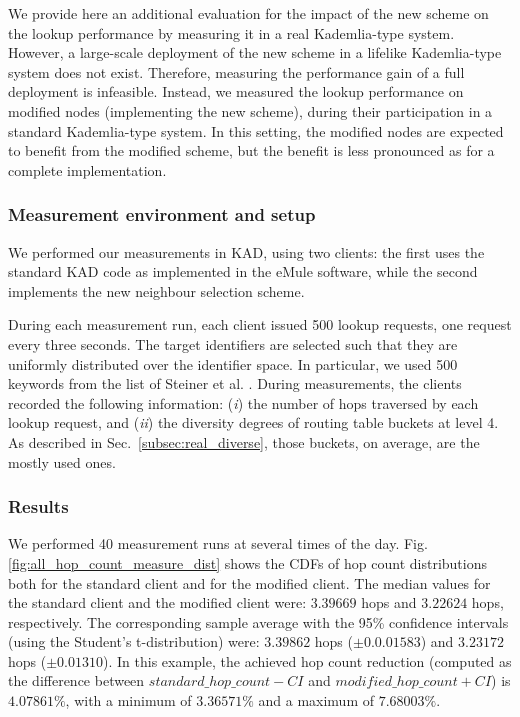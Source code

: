 \documentclass[10pt, conference, compsocconf, letterpaper]{IEEEtran}
\begin{document}
We provide here an additional evaluation for the impact of the new scheme on the lookup performance by measuring it in a real Kademlia-type system. However, a large-scale deployment of the new scheme in a lifelike Kademlia-type system does not exist. Therefore, measuring the performance gain of a full deployment is infeasible. Instead, we measured the lookup performance on modified nodes (implementing the new scheme), during their participation in a standard Kademlia-type system. In this setting, the modified nodes are expected to benefit from the modified scheme, but the 
benefit is less pronounced as for a complete implementation.





\vspace{3pt}
\subsubsection{\textbf{Measurement environment and setup}} We performed our measurements in KAD, using two clients: the first uses the standard KAD code as implemented in the eMule software, while the second implements the new neighbour selection scheme. 

During each measurement run, each client issued 500 lookup requests, one request every three seconds. The target identifiers are selected such that they are uniformly distributed over the identifier space. In particular, we used 500 keywords from the list of Steiner et al. \cite{steiner10evaluating}. During measurements, the clients recorded the following information: (\emph{i}) the number of hops traversed by each lookup request, and (\emph{ii}) the diversity degrees of routing table buckets at level 4. As described in Sec.~\ref{subsec:real_diverse}, those buckets, on average, are the mostly used ones.

\vspace{3pt}
\subsubsection{\textbf{Results}} 

We performed 40 measurement runs at several times of the day. Fig.\,\ref{fig:all_hop_count_measure_dist} shows the CDFs of hop count distributions both for the standard client and for the modified client. The median values for the standard client and the modified client were: $3.39669$ hops and $3.22624$ hops, respectively. The corresponding sample average with the 95\% confidence intervals (using the Student's t-distribution) were: $3.39862$ hops ($\pm 0.0.01583$) and $3.23172$ hops ($\pm 0.01310$). In this example, the achieved hop count reduction (computed as the difference between $standard\_hop\_count - CI$ and $modified\_hop\_count + CI$) is $4.07861\%$, with a minimum of $3.36571\%$ and a maximum of $7.68003\%$. 
\end{document}
